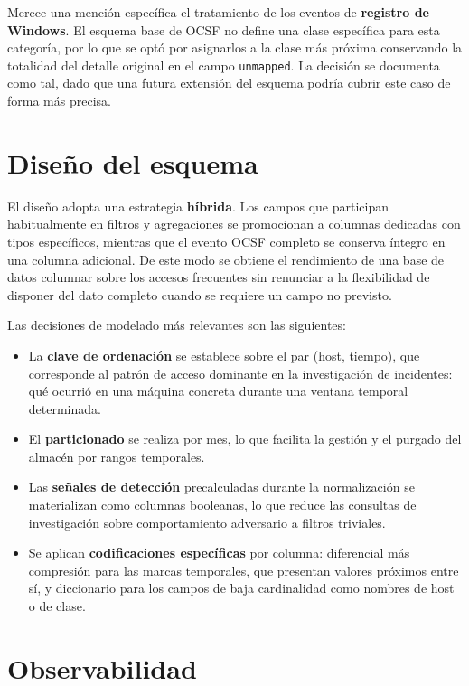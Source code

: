 Merece una mención específica el tratamiento de los eventos de \textbf{registro de Windows}.
El esquema base de OCSF no define una clase específica para esta categoría, por lo que se
optó por asignarlos a la clase más próxima conservando la totalidad del detalle original en
el campo \texttt{unmapped}. La decisión se documenta como tal, dado que una futura extensión
del esquema podría cubrir este caso de forma más precisa.


\section{Diseño del esquema}

El diseño adopta una estrategia \textbf{híbrida}. Los campos que participan habitualmente en
filtros y agregaciones se promocionan a columnas dedicadas con tipos específicos, mientras que
el evento OCSF completo se conserva íntegro en una columna adicional. De este modo se obtiene
el rendimiento de una base de datos columnar sobre los accesos frecuentes sin renunciar a la
flexibilidad de disponer del dato completo cuando se requiere un campo no previsto.

Las decisiones de modelado más relevantes son las siguientes:

\begin{itemize}
    \item La \textbf{clave de ordenación} se establece sobre el par (host, tiempo), que
    corresponde al patrón de acceso dominante en la investigación de incidentes: qué ocurrió
    en una máquina concreta durante una ventana temporal determinada.
    \item El \textbf{particionado} se realiza por mes, lo que facilita la gestión y el purgado
    del almacén por rangos temporales.
    \item Las \textbf{señales de detección} precalculadas durante la normalización se
    materializan como columnas booleanas, lo que reduce las consultas de investigación sobre
    comportamiento adversario a filtros triviales.
    \item Se aplican \textbf{codificaciones específicas} por columna: diferencial más
    compresión para las marcas temporales, que presentan valores próximos entre sí, y
    diccionario para los campos de baja cardinalidad como nombres de host o de clase.
\end{itemize}


\section{Observabilidad}
\label{anx:observabilidad}

